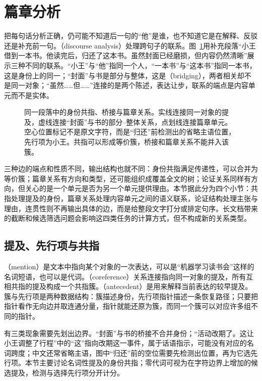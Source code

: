 \section{篇章分析}
\label{sec:nlp-analysis-discourse}

把每句话分析正确，仍可能不知道后一句的“他”是谁，也不知道它是在解释、反驳还是补充前一句。（discourse analysis）处理跨句子的联系。图~\ref{fig:nlp-analysis-discourse}用补充段落“小王借到一本书。他读完后，归还了这本书。虽然封面已经磨损，但内容仍然清晰”展示三种不同的联系。“小王”与“他”指同一个人，“一本书”与“这本书”指同一本书，这是身份上的同一；“封面”与书是部分与整体，这是（bridging），两者相关却不是同一对象；“虽然……但……”连接的是两个陈述，表达让步，联系的端点是内容单元而不是实体。

\begin{figure}[htbp]
  \centering
  
  \caption{同一段落中的身份共指、桥接与篇章关系。实线连接同一对象的提及，虚线连接“封面”与书的部分--整体关系，点划线连接篇章单元。空心位置标记不是原文字符，而是“归还”前检测出的省略主语位置，先行项为小王。共指可以形成等价簇，桥接和篇章关系不能并入该簇。}
  \label{fig:nlp-analysis-discourse}
\end{figure}
\FloatBarrier

三种边的端点和性质不同，输出结构也就不同：身份共指满足传递性，可以合并为等价簇；篇章关系有方向和类型，还可能组织成覆盖全文的树；论证关系同样有方向，但关心的是一个单元是否为另一个单元提供理由。本节据此分为四个小节：共指处理提及的身份，篇章关系处理内容单元之间的语义联系，论证结构处理主张与理由，连贯性则不再输出具体的边，而是给整段文字打分或排定句序。长文档带来的截断和候选筛选问题会影响这四类任务的计算方式，但不构成新的关系类型。

\subsection{提及、先行项与共指}
\label{sec:nlp-analysis-coreference}

（mention）是文本中指向某个对象的一次表达，可以是“机器学习读书会”这样的名词短语，也可以是代词。（coreference）关系连接指向同一对象的提及，所有互相共指的提及构成一个共指簇。（antecedent）是用来解释当前表达的较早提及。簇与先行项是两种数据结构：簇描述身份，先行项指针描述一条恢复路径；只要把指针看作无向边并取连通分量，指针就能还原为簇，而同一个簇可以对应许多组不同的指针。

有三类现象需要先划出边界。“封面”与书的桥接不合并身份；“活动改期了。这让小王调整了行程”中的“这”指向改期这一事件，属于话语指示，可能没有对应的名词跨度；中文还常省略主语，图中“归还”前的空位需要先检测出位置，再为它选先行项。本节主要讨论名词性提及的身份共指；零代词可视为在字符边界上增加的候选提及，检测与选择先行项分开计分。

